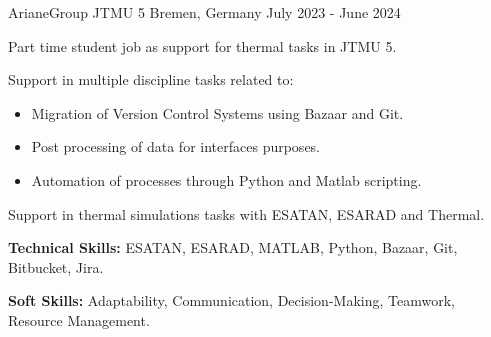 

\begin{cventries}
  {ArianeGroup JTMU 5}
  {Bremen, Germany}
  {July 2023 - June 2024}
  {
    \begin{cvitems}
      \item Part time student job as support for thermal tasks in JTMU
      5.
      \item Support in multiple discipline tasks related to:
      \begin{itemize}
        \item[\checkmark] Migration of Version Control Systems using
        Bazaar and Git.
        \item[\checkmark] Post processing of data for interfaces
        purposes.
        \item[\checkmark] Automation of processes through Python and
        Matlab scripting.
      \end{itemize}
      \item Support in thermal simulations tasks with ESATAN, ESARAD
      and Thermal.
      \item \textbf{Technical Skills:} ESATAN, ESARAD, MATLAB, Python,
      Bazaar, Git, Bitbucket, Jira.
      \item \textbf{Soft Skills:} Adaptability, Communication,
      Decision-Making, Teamwork, Resource Management.
    \end{cvitems}
  }


\end{cventries}
